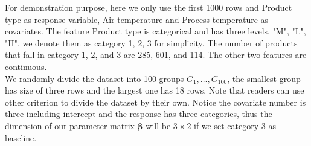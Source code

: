 \documentclass[12pt]{article}
\begin{document}
For demonstration purpose, here we only use the first 1000 rows and Product type as response variable, Air temperature and Process temperature as covariates. The feature Product type is categorical and has three levels, "M", "L", "H", we denote them as category 1, 2, 3 for simplicity. The number of products that fall in category 1, 2, and 3 are 285, 601, and 114. The other two features are continuous.
\\
We randomly divide the dataset into 100 groups $G_1,\dots,G_{100}$, the smallest group has size of three rows and the largest one has 18 rows. Note that readers can use other criterion to divide the dataset by their own. Notice the covariate number is three including intercept and the response has three categories, thus the dimension of our parameter matrix $\boldsymbol{\beta}$ will be $3 \times 2$ if we set category 3 as baseline.
\end{document}
